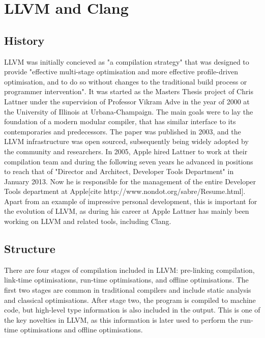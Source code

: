 \documentclass[parskip]{cs4rep}
\begin{document}
\section{LLVM and Clang}

\subsection{History}

LLVM was initially concieved as "a compilation strategy" that was designed to provide "effective multi-stage optimisation and more effective profile-driven optimisation, and to do so without changes to the traditional build process or programmer intervention"\cite{Lattner2002}. It was started as the Masters Thesis project of Chris Lattner under the supervision of Professor Vikram Adve in the year of 2000 at the University of Illinois at Urbana-Champaign. The main goals were to lay the foundation of a modern modular compiler, that has similar interface to its contemporaries and predecessors. The paper was published in 2003, and the LLVM infrastructure was open sourced, subsequently being widely adopted by the community and researchers\cite{Lattner}. In 2005, Apple hired Lattner to work at their compilation team and during the following seven years he advanced in positions to reach that of "Director and Architect, Developer Tools Department" in January 2013. Now he is responsible for the management of the entire Developer Tools department at Apple[cite http://www.nondot.org/sabre/Resume.html]. Apart from an example of impressive personal development, this is important for the evolution of LLVM, as during his career at Apple Lattner has mainly been working on LLVM and related tools, including Clang.

\subsection{Structure}

There are four stages of compilation included in LLVM: pre-linking compilation, link-time optimisations, run-time optimisations, and offline optimisations\cite{Lattner2002}. The first two stages are common in traditional compilers and include static analysis and classical optimisations. After stage two, the program is compiled to machine code, but high-level type information is also included in the output. This is one of the key novelties in LLVM, as this information is later used to perform the run-time optimisations and offline optimisations.
\end{document}

